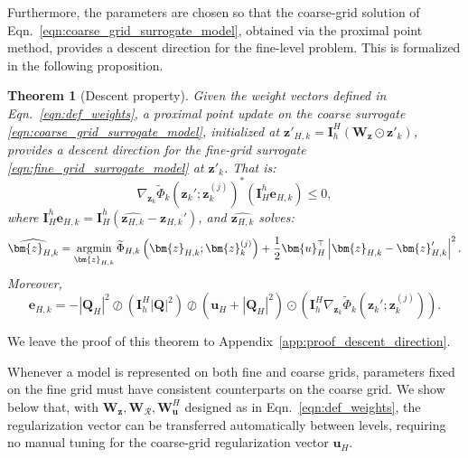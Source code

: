 \documentclass{article}
\numberwithin{equation}{section}
\newtheorem{theorem}{Theorem}[section] %
\begin{document}
{Furthermore, the parameters are chosen so that the coarse-grid solution of  Eqn.~\eqref{eqn:coarse_grid_surrogate_model}, obtained via the proximal point method, provides a descent direction for the fine-level problem. This is formalized in the following proposition.}
\begin{theorem}[Descent property]\label{prop:descent_direction}
    Given the weight vectors defined in~ Eqn.~\eqref{eqn:def_weights}, a proximal point update on the coarse surrogate \eqref{eqn:coarse_grid_surrogate_model}, initialized at $\bm{z}'_{H,k}= \bm I_h^H(\bm{W}_{\bm{z}}\odot\bm{z}'_k)$, provides a descent direction for the fine-grid surrogate \eqref{eqn:fine_grid_surrogate_model} at $\bm{z}'_k$. That is:
    \begin{equation*}       \nabla_{\bm{z}_k}\widetilde{\Phi}_k\left(\bm{z}_k'; \bm{z}_k^{(j)}\right)^*\left(\bm{I}_H^h\bm{e}_{H,k}\right)\leq0,
    \end{equation*}
    where $\bm{I}_H^h\bm{e}_{H,k} = \bm{I}_H^h\left(\widehat{\bm{z}_{H,k}}-\bm{z}_{H,k}'\right)$, and $\widehat{\bm{z}_{H,k}}$ solves:
    \begin{equation}\label{eqn:coarse_proximal}
            \widehat{\bm{z}_{H,k}} = \operatornamewithlimits{argmin}_{\bm{z}_{H,k}} \widetilde{\Phi}_{H,k}\left(\bm{z}_{H,k}; \bm{z}_k^{(j)}\right)+\frac{1}{2}\bm{u}_H^\top\left|\bm{z}_{H,k}-\bm{z}_{H,k}'\right|^2.
        \end{equation}
        Moreover,
        \begin{equation}\label{eqn:coarse_grid_rPIE_update}
            \bm{e}_{H,k} = -|\bm{Q}_H|^2\oslash\left(\bm{I}_h^H|\bm{Q}|^2\right)\oslash\left(\bm{u}_H+|\bm{Q}_H|^2\right)\odot\left(\bm{I}_h^H\nabla_{\bm{z}_k}\widetilde{\Phi}_k\left(\bm{z}_k'; \bm{z}_k^{(j)}\right)\right).
        \end{equation}
\end{theorem}
We leave the proof of this theorem to Appendix~\ref{app:proof_descent_direction}.

Whenever a model is represented on both fine and coarse grids, parameters fixed on the fine grid must have consistent counterparts on the coarse grid.  We show below that, with $\bm{W}_{\bm{z}},\bm{W}_{\mathcal{R}},\bm{W}_{\bm{u}}^H$ designed as in Eqn.~\eqref{eqn:def_weights}, the regularization vector can be transferred automatically between levels, requiring no manual tuning for the coarse-grid regularization vector $\bm{u}_H$. 
\end{document}
